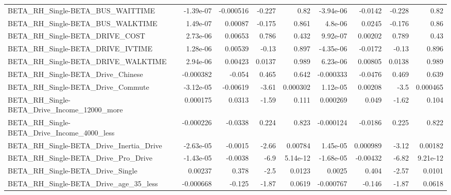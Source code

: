 \begin{tabular}{lrrrrrrrr}
BETA\_RH\_Single-BETA\_BUS\_WAITTIME                   &   -1.39e-07 &    -0.000516 &   -0.227 &     0.82 &  -3.94e-06 &     -0.0142 &       -0.228 &          0.82 \\
BETA\_RH\_Single-BETA\_BUS\_WALKTIME                   &    1.49e-07 &      0.00087 &   -0.175 &    0.861 &    4.8e-06 &      0.0245 &       -0.176 &          0.86 \\
BETA\_RH\_Single-BETA\_DRIVE\_COST                     &    2.73e-06 &      0.00653 &    0.786 &    0.432 &   9.92e-07 &     0.00202 &        0.789 &          0.43 \\
BETA\_RH\_Single-BETA\_DRIVE\_IVTIME                   &    1.28e-06 &      0.00539 &    -0.13 &    0.897 &  -4.35e-06 &     -0.0172 &        -0.13 &         0.896 \\
BETA\_RH\_Single-BETA\_DRIVE\_WALKTIME                 &    2.94e-06 &      0.00423 &   0.0137 &    0.989 &   6.23e-06 &     0.00805 &       0.0138 &         0.989 \\
BETA\_RH\_Single-BETA\_Drive\_Chinese                  &   -0.000382 &       -0.054 &    0.465 &    0.642 &  -0.000333 &     -0.0476 &        0.469 &         0.639 \\
BETA\_RH\_Single-BETA\_Drive\_Commute                  &   -3.12e-05 &     -0.00619 &    -3.61 & 0.000302 &   1.12e-05 &     0.00208 &         -3.5 &      0.000465 \\
BETA\_RH\_Single-BETA\_Drive\_Income\_12000\_more        &    0.000175 &       0.0313 &    -1.59 &    0.111 &   0.000269 &       0.049 &        -1.62 &         0.104 \\
BETA\_RH\_Single-BETA\_Drive\_Income\_4000\_less         &   -0.000226 &      -0.0338 &    0.224 &    0.823 &  -0.000124 &     -0.0186 &        0.225 &         0.822 \\
BETA\_RH\_Single-BETA\_Drive\_Inertia\_Drive            &   -2.63e-05 &      -0.0015 &    -2.66 &  0.00784 &   1.45e-05 &    0.000989 &        -3.12 &       0.00182 \\
BETA\_RH\_Single-BETA\_Drive\_Pro\_Drive                &   -1.43e-05 &      -0.0038 &     -6.9 & 5.14e-12 &  -1.68e-05 &    -0.00432 &        -6.82 &      9.21e-12 \\
BETA\_RH\_Single-BETA\_Drive\_Single                   &     0.00237 &        0.378 &     -2.5 &   0.0123 &     0.0025 &       0.404 &        -2.57 &        0.0101 \\
BETA\_RH\_Single-BETA\_Drive\_age\_35\_less              &   -0.000668 &       -0.125 &    -1.87 &   0.0619 &  -0.000767 &      -0.146 &        -1.87 &        0.0618 \\

\end{tabular}
